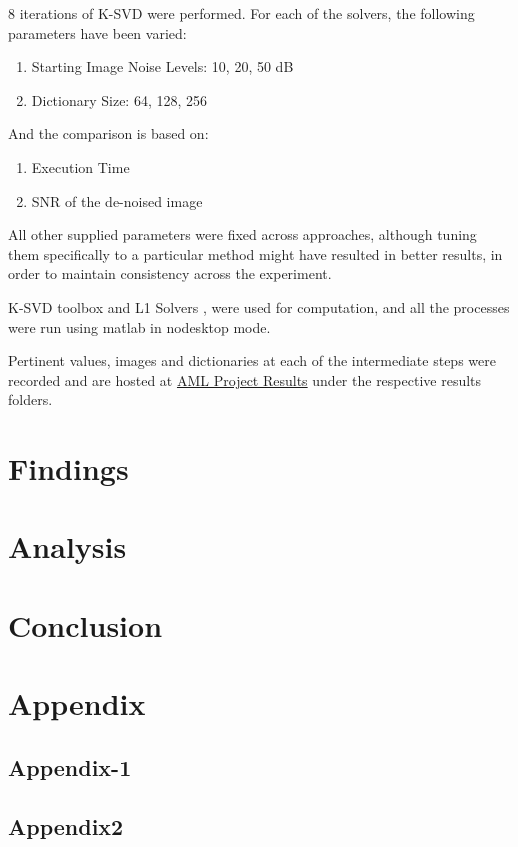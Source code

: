 \documentclass{article} %
\begin{document}
8 iterations of K-SVD were performed.
For each of the solvers, the following parameters have been varied:
\begin{enumerate}
\item Starting Image Noise Levels: 10, 20, 50 dB
\item Dictionary Size: 64, 128, 256
\end{enumerate}

And the comparison is based on:
\begin{enumerate}
\item Execution Time
\item SNR of the de-noised image
\end{enumerate}

All other supplied parameters were fixed across approaches, although tuning them specifically to a particular method might have resulted in better results, in order to maintain consistency across the experiment.

K-SVD toolbox \citep{rubinstein2008efficient} and L1 Solvers \citep{yang2010fast}, \citep{lee2007efficient} were used for computation, and all the processes were run using matlab in nodesktop mode.

Pertinent values, images and dictionaries at each of the intermediate steps were recorded and are hosted at \href{https://github.com/dkdfirefly/aml}{AML Project Results} under the respective results folders.

\vspace{.2cm}
\section{Findings}
\vspace{.2cm}

\section{Analysis}

\section{Conclusion}


\nocite{*}



\newpage
\section{Appendix}


\subsection{Appendix-1}
\label{sec:Appendix1}
 

\subsection{Appendix2}
\label{Appendix2}
\end{document}
